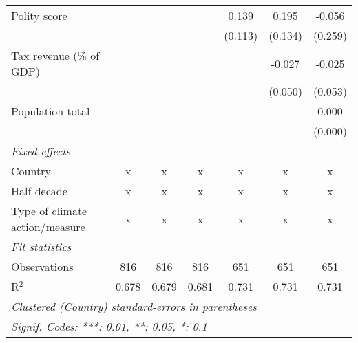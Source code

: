 \begin{tabular}{lcccccc}
   Polity score                                             &              &               &                & 0.139          & 0.195          & -0.056\\   
                                                            &              &               &                & (0.113)        & (0.134)        & (0.259)\\   
   Tax revenue (\% of GDP)                                  &              &               &                &                & -0.027         & -0.025\\   
                                                            &              &               &                &                & (0.050)        & (0.053)\\   
   Population total                                         &              &               &                &                &                & 0.000\\   
                                                            &              &               &                &                &                & (0.000)\\   
   \emph{Fixed effects}\\
   Country                                                  & x            & x             & x              & x              & x              & x\\  
   Half decade                                              & x            & x             & x              & x              & x              & x\\  
   Type of climate action/measure                           & x            & x             & x              & x              & x              & x\\  
   \midrule \emph{Fit statistics}\\
   Observations                                             & 816          & 816           & 816            & 651            & 651            & 651\\  
   R$^2$                                                    & 0.678        & 0.679         & 0.681          & 0.731          & 0.731          & 0.731\\  
   \midrule
   \multicolumn{7}{l}{\emph{Clustered (Country) standard-errors in parentheses}}\\
   \multicolumn{7}{l}{\emph{Signif. Codes: ***: 0.01, **: 0.05, *: 0.1}}\\
\end{tabular}
\par\endgroup



